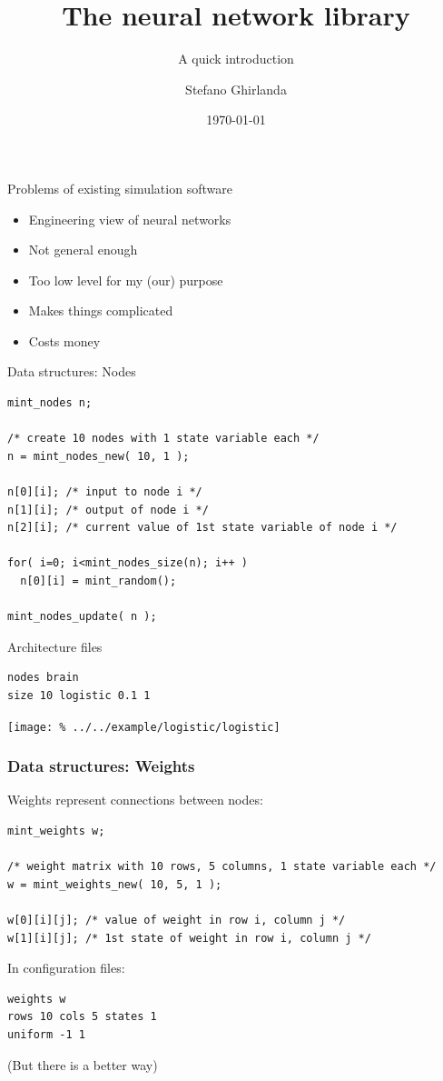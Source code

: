 \documentclass[12pt]{beamer}
\title{The \mint neural network library}
\author[S Ghirlanda]{Stefano Ghirlanda}
\subtitle{A quick introduction}
\date{\today}
\begin{document}
\begin{frame}
  \titlepage
\end{frame}

\begin{frame}{Problems of existing simulation software}
  \begin{itemize}
  \item Engineering view of neural networks
  \item Not general enough
  \item Too low level for my (our) purpose
  \item Makes things complicated
  \item Costs money
  \end{itemize}
\end{frame}

\begin{frame}[fragile]{Data structures: Nodes}

\begin{lstlisting}
mint_nodes n;

/* create 10 nodes with 1 state variable each */ 
n = mint_nodes_new( 10, 1 ); 

n[0][i]; /* input to node i */
n[1][i]; /* output of node i */
n[2][i]; /* current value of 1st state variable of node i */

for( i=0; i<mint_nodes_size(n); i++ )
  n[0][i] = mint_random();

mint_nodes_update( n );

\end{lstlisting}

\end{frame}

\begin{frame}[fragile]{Architecture files}

\begin{lstlisting}
nodes brain
size 10 logistic 0.1 1 
\end{lstlisting}
  \begin{center}
  \texttt{[image: \%
    ../../example/logistic/logistic]}    
  \end{center}
\end{frame}

\begin{frame}
  \frametitle{Data structures: Weights}
  Weights represent connections between nodes:
\begin{lstlisting}
mint_weights w;

/* weight matrix with 10 rows, 5 columns, 1 state variable each */ 
w = mint_weights_new( 10, 5, 1 );

w[0][i][j]; /* value of weight in row i, column j */
w[1][i][j]; /* 1st state of weight in row i, column j */
\end{lstlisting}

\pause

In configuration files:
\begin{lstlisting}
weights w
rows 10 cols 5 states 1 
uniform -1 1
\end{lstlisting}
(But there is a better way)

\end{frame}
\end{document}
